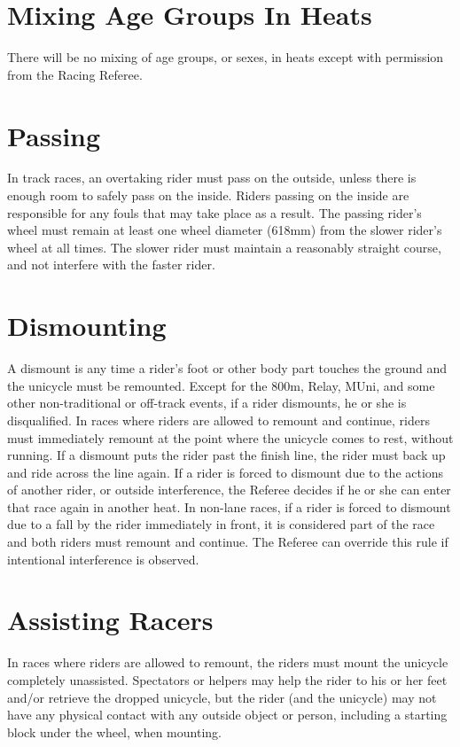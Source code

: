 \section{Mixing Age Groups In Heats}
There will be no mixing of age groups, or sexes, in heats except with permission from the Racing Referee.

\section{Passing}
In track races, an overtaking rider must pass on the outside, unless there is enough room to safely pass on the inside.
Riders passing on the inside are responsible for any fouls that may take place as a result.
The passing rider’s wheel must remain at least one wheel diameter (618mm) from the slower rider’s wheel at all times.
The slower rider must maintain a reasonably straight course, and not interfere with the faster rider.

\section{Dismounting}
A dismount is any time a rider’s foot or other body part touches the ground and the unicycle must be remounted.
Except for the 800m, Relay, MUni, and some other non-traditional or off-track events, if a rider dismounts, he or she is disqualified.
In races where riders are allowed to remount and continue, riders must immediately remount at the point where the unicycle comes to rest, without running.
If a dismount puts the rider past the finish line, the rider must back up and ride across the line again.
If a rider is forced to dismount due to the actions of another rider, or outside interference, the Referee decides if he or she can enter that race again in another heat.
In non-lane races, if a rider is forced to dismount due to a fall by the rider immediately in front, it is considered part of the race and both riders must remount and continue.
The Referee can override this rule if intentional interference is observed.

\section{Assisting Racers}
In races where riders are allowed to remount, the riders must mount the unicycle completely unassisted.
Spectators or helpers may help the rider to his or her feet and/or retrieve the dropped unicycle, but the rider (and the unicycle) may not have any physical contact with any outside object or person, including a starting block under the wheel, when mounting.

